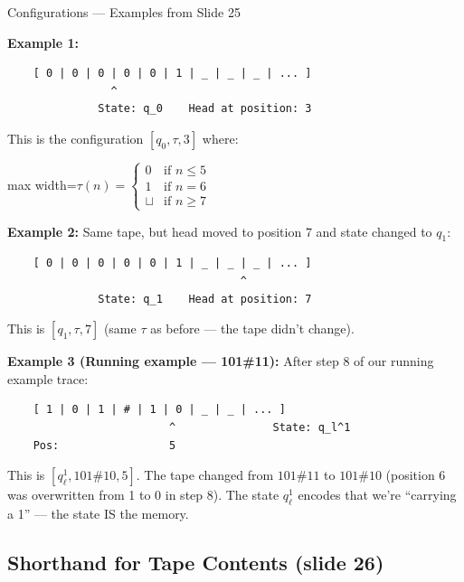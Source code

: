 \documentclass[11pt,a4paper]{article}
\newcommand{\fitmath}[1]{\begin{adjustbox}{max width=\linewidth}$\displaystyle #1$\end{adjustbox}}
\begin{document}
\begin{examplebox}{Configurations --- Examples from Slide 25}

\textbf{Example 1:}
\begin{lstlisting}
    [ 0 | 0 | 0 | 0 | 0 | 1 | _ | _ | _ | ... ]
                ^
              State: q_0    Head at position: 3
\end{lstlisting}

This is the configuration $[q_0, \tau, 3]$ where:
\fitmath{\tau(n) = \begin{cases} 0 & \text{if } n \leq 5 \\ 1 & \text{if } n = 6 \\ \sqcup & \text{if } n \geq 7 \end{cases}}

\textbf{Example 2:} Same tape, but head moved to position 7 and state changed to $q_1$:
\begin{lstlisting}
    [ 0 | 0 | 0 | 0 | 0 | 1 | _ | _ | _ | ... ]
                                    ^
              State: q_1    Head at position: 7
\end{lstlisting}

This is $[q_1, \tau, 7]$ (same $\tau$ as before --- the tape didn't change).

\vspace{0.5em}
\textbf{Example 3 (Running example --- 101\#11):} After step 8 of our running example trace:
\begin{lstlisting}
    [ 1 | 0 | 1 | # | 1 | 0 | _ | _ | ... ]
                         ^               State: q_l^1
    Pos:                 5
\end{lstlisting}
This is $[q_\ell^1, 101\#10, 5]$. The tape changed from $101\#11$ to $101\#10$ (position 6 was overwritten from 1 to 0 in step 8). The state $q_\ell^1$ encodes that we're ``carrying a 1'' --- the state IS the memory.
\end{examplebox}

\subsection{Shorthand for Tape Contents (slide 26)}
\end{document}
